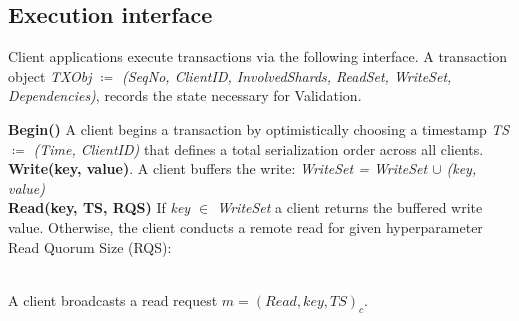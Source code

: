 \subsection{Execution interface}
Client applications execute transactions via the following interface. A transaction object \textit{TXObj $\coloneqq$ (SeqNo, ClientID, InvolvedShards, ReadSet, WriteSet, Dependencies)}, records the state necessary for Validation.

\textbf{Begin()} A client begins a transaction by optimistically choosing a timestamp \textit{TS $\coloneqq$ (Time, ClientID)} that defines a total serialization order across all clients.  \\
\textbf{Write(key, value)}. A client buffers the write: \textit{WriteSet = WriteSet $\cup$ (key, value)}\\
\textbf{Read(key, TS, RQS)} 
If \textit{key $\in$ WriteSet} a client returns the buffered write value. Otherwise, the client conducts a remote read for given hyperparameter Read Quorum Size (RQS):

\\
A client broadcasts a read request  $m = (Read, key, TS)_c$.

{}

